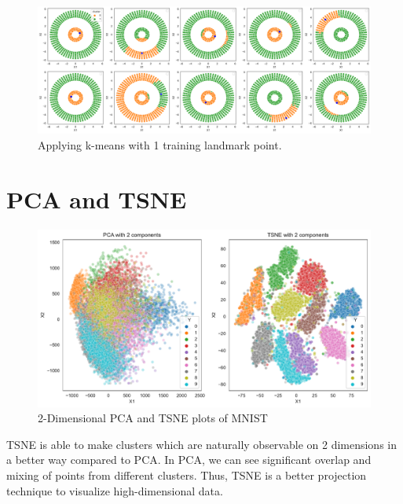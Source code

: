 \documentclass[a4paper,11pt]{article}
\begin{document}
\begin{mlsolution}
        \begin{figure}[h]
            \centering
            \includegraphics[width=\textwidth]{images/k-means-landmark.pdf}
            \caption{Applying k-means with 1 training landmark point.}
            \label{fig:k-means-landmark}
        \end{figure}

    \section{PCA and TSNE}
        \begin{figure}[h]
            \includegraphics[width=\textwidth]{images/pca-tsne.pdf}
            \caption{2-Dimensional PCA and TSNE plots of MNIST}
            \label{fig:pca-tsne}
        \end{figure}
        TSNE is able to make clusters which are naturally observable on 2 dimensions in a better way compared to PCA. In PCA, we can see significant overlap and mixing of points from different clusters. Thus, TSNE is a better projection technique to visualize high-dimensional data.

\end{mlsolution}
\end{document}
